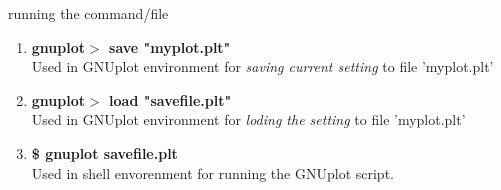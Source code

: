 \documentclass{beamer}
\begin{document}
	\begin{frame}
		running the command/file
		\begin{enumerate}
			\item \textbf{gnuplot$>$ save "myplot.plt"} \\
			Used in GNUplot environment for \textit{saving current setting} to file 'myplot.plt'
			\item \textbf{gnuplot$>$ load "savefile.plt"}\\
			Used in GNUplot environment for \textit{loding the setting} to file 'myplot.plt'
			
			\item  \textbf{\$ gnuplot savefile.plt}\\
			Used in shell envorenment for running the GNUplot script.
			
		\end{enumerate}
	\end{frame}	
\end{document}
